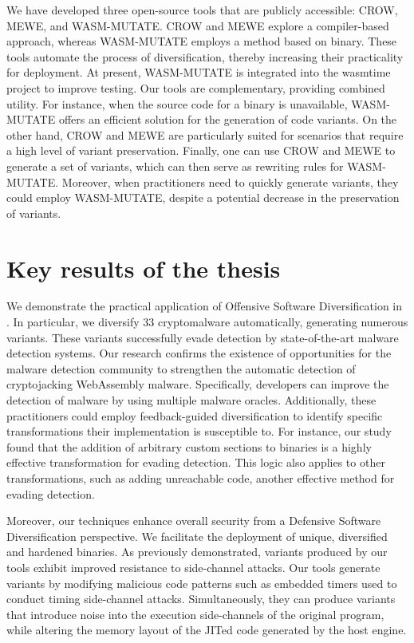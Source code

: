We have developed three open-source tools that are publicly accessible: CROW, MEWE, and WASM-MUTATE. 
CROW and MEWE explore a compiler-based approach, whereas WASM-MUTATE employs a method based on binary. 
These tools automate the process of diversification, thereby increasing their practicality for deployment. 
At present, WASM-MUTATE is integrated into the wasmtime project to improve testing. 
Our tools are complementary, providing combined utility. 
For instance, when the source code for a \Wasm binary is unavailable, WASM-MUTATE offers an efficient solution for the generation of code variants. 
On the other hand, CROW and MEWE are particularly suited for scenarios that require a high level of variant preservation.
Finally, one can use CROW and MEWE to generate a set of variants, which can then serve as rewriting rules for WASM-MUTATE. 
Moreover, when practitioners need to quickly generate variants, they could employ WASM-MUTATE, despite a potential decrease in the preservation of variants.



\section{Key results of the thesis}

We demonstrate the practical application of Offensive Software Diversification in \Wasm.
In particular, we diversify 33 \Wasm cryptomalware automatically, generating numerous variants.
These variants successfully evade detection by state-of-the-art malware detection systems.
Our research confirms the existence of opportunities for the malware detection community to strengthen the automatic detection of cryptojacking WebAssembly malware.
Specifically, developers can improve the detection of \Wasm malware by using multiple malware oracles.
Additionally, these practitioners could employ feedback-guided diversification to identify specific transformations their implementation is susceptible to.
For instance, our study found that the addition of arbitrary custom sections to \Wasm binaries is a highly effective transformation for evading detection.
This logic also applies to other transformations, such as adding unreachable code, another effective method for evading detection.

Moreover, our techniques enhance overall security from a Defensive Software Diversification perspective.
We facilitate the deployment of unique, diversified and hardened \Wasm binaries.
As previously demonstrated, \Wasm variants produced by our tools exhibit improved resistance to side-channel attacks.
Our tools generate variants by modifying malicious code patterns such as embedded timers used to conduct timing side-channel attacks.
Simultaneously, they can produce variants that introduce noise into the execution side-channels of the original program, while altering the memory layout of the JITed code generated by the host engine.

